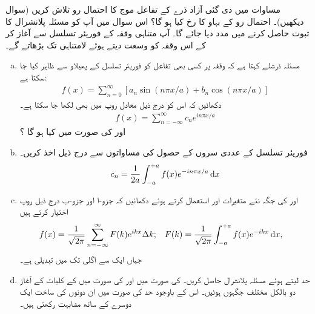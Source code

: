 مساوات  میں دی گئی آزاد ذرے کے تفاعل موج کا احتمال رو  تلاش کریں (سوال  دیکھیں)۔ احتمال رو کے بہاو کا رخ کیا ہو گا؟
اس سوال میں آپ کو مسئلہ پلانشرال کا ثبوت حاصل کرنے میں مدد دیا جائے گا۔ آپ متناہی وقفہ کے فوریئر تسلسل سے آغاز کر کے اس وقفہ کو وسعت دیتے ہوئے لامتناہی تک بڑھاتے گے۔ 

\begin{enumerate}[a. ]
\item 
مسئلہ ڈرشلے کہتا ہے کہ وقفہ  پر کسی بھی تفاعل   کو فوریئر تسلسل کے پھیلاو سے ظاہر کیا جا سکتا ہے:
\begin{align*}
f(x) = \sum_{n=0}^{\infty} [ a_{n}\sin(  n\pi x/a )  + b_{n}\cos(  n\pi x/a )]
\end{align*}
دکھائیں کہ اس کو درج ذیل معادل روپ میں بھی لکھا جا سکتا ہے۔
\begin{align*}
f(x) = \sum_{n=-\infty}^{\infty} c_{n}e^{i n \pi x /a }
\end{align*}
 اور   کی صورت میں  کیا ہو گا ؟
 \item
 فوریئر تسلسل کے عددی سروں کے حصول کی مساواتوں سے درج ذیل اخذ کریں۔
\begin{align*}
c_{n} = \frac{1}{2a} \int_{-a}^{+a} f(x)e^{-in\pi x/a} \dif x
\end{align*}
\item
{}  اور   کی جگہ نئے متغیرات   اور 
  استعمال کرتے ہوئے  دکھائیں کہ جزو-ا اور جزو-ب درج ذیل روپ اختیار کرتے ہیں 
\begin{align*}
f(x) &= \frac{1}{\sqrt{2 \pi }} \sum_{n=-\infty}^{\infty} F(k)e^{ikx} \Delta k; && F(k) = \frac{1}{\sqrt{2\pi}} \int_{-a}^{+a} f(x) e^{-ikx} \dif x,
\end{align*}
جہاں ایک  سے اگلی  تک  میں تبدیلی   ہے۔ 
\item
حد   لیتے ہوئے مسئلہ پلانشرال حاصل کریں۔    کی صورت میں  اور   کی صورت میں    کے کلیات کے آغاز دو بالکل مختلف جگہوں  ہوئیں۔  اس کے باوجود  حد  کی صورت میں ان دونوں کی ساخت ایک دوسرے کے ساتھ مشابہت رکھتی ہیں۔ 
\end{enumerate}
